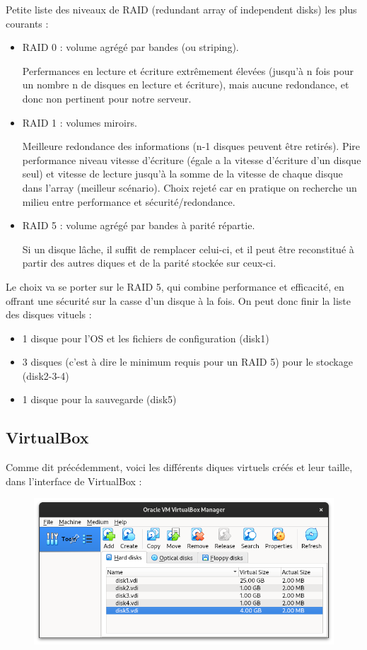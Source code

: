 \documentclass{article}
\begin{document}
	Petite liste des niveaux de RAID (redundant array of independent disks) les plus courants :
	\begin{itemize}
	\item RAID 0 : volume agrégé par bandes (ou striping).
	
	Perfermances en lecture et écriture extrêmement élevées (jusqu'à n fois pour un nombre n de disques en lecture et écriture), mais aucune redondance, et donc non pertinent pour notre serveur.
	\item RAID 1 : volumes miroirs. 
	
	Meilleure redondance des informations (n-1 disques peuvent être retirés). Pire performance niveau vitesse d'écriture (égale a la vitesse d'écriture d'un disque seul) et vitesse de lecture jusqu'à la somme de la vitesse de chaque disque dans l'array (meilleur scénario). Choix rejeté car en pratique on recherche un milieu entre performance et sécurité/redondance.

	\item RAID 5 : volume agrégé par bandes à parité répartie.

	Si un disque lâche, il suffit de remplacer celui-ci, et il peut être reconstitué à partir des autres diques et de la parité stockée sur ceux-ci.

	\end{itemize}

Le choix va se porter sur le RAID 5, qui combine performance et efficacité, en offrant une sécurité sur la casse d'un disque à la fois. On peut donc finir la liste des disques vituels :
\begin{itemize}
\item 1 disque pour l'OS et les fichiers de configuration (disk1)
\item 3 disques (c'est à dire le minimum requis pour un RAID 5) pour le stockage (disk2-3-4)
\item 1 disque pour la sauvegarde (disk5)
\end{itemize}

\newpage

\subsection{VirtualBox}

Comme dit précédemment, voici les différents diques virtuels créés et leur taille, dans l'interface de VirtualBox :

\begin{figure}[h!]
		\centering
		\includegraphics[width=1\textwidth]{vbox1.png}
\end{figure}
\end{document}
